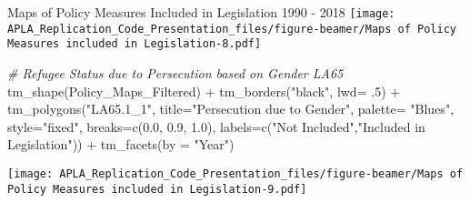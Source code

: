 \documentclass[
  ignorenonframetext,
]{beamer}
\newenvironment{Shaded}{\begin{snugshade}}{\end{snugshade}}
\newcommand{\AttributeTok}[1]{\textcolor[rgb]{0.77,0.63,0.00}{#1}}
\newcommand{\CommentTok}[1]{\textcolor[rgb]{0.56,0.35,0.01}{\textit{#1}}}
\newcommand{\DecValTok}[1]{\textcolor[rgb]{0.00,0.00,0.81}{#1}}
\newcommand{\FloatTok}[1]{\textcolor[rgb]{0.00,0.00,0.81}{#1}}
\newcommand{\FunctionTok}[1]{\textcolor[rgb]{0.00,0.00,0.00}{#1}}
\newcommand{\NormalTok}[1]{#1}
\newcommand{\SpecialCharTok}[1]{\textcolor[rgb]{0.00,0.00,0.00}{#1}}
\newcommand{\StringTok}[1]{\textcolor[rgb]{0.31,0.60,0.02}{#1}}
\begin{document}
\begin{frame}[fragile]{Maps of Policy Measures Included in Legislation
1990 - 2018}
\texttt{[image: APLA\_Replication\_Code\_Presentation\_files/figure-beamer/Maps of Policy Measures included in Legislation-8.pdf]}

\begin{Shaded}
\begin{Highlighting}[]
\CommentTok{\# Refugee Status due to Persecution based on Gender LA65 }
\FunctionTok{tm\_shape}\NormalTok{(Policy\_Maps\_Filtered) }\SpecialCharTok{+} \FunctionTok{tm\_borders}\NormalTok{(}\StringTok{"black"}\NormalTok{, }\AttributeTok{lwd=}\NormalTok{ .}\DecValTok{5}\NormalTok{) }\SpecialCharTok{+} \FunctionTok{tm\_polygons}\NormalTok{(}\StringTok{"LA65.1\_1"}\NormalTok{, }\AttributeTok{title=}\StringTok{"Persecution due to Gender"}\NormalTok{, }\AttributeTok{palette=} \StringTok{"Blues"}\NormalTok{, }\AttributeTok{style=}\StringTok{"fixed"}\NormalTok{, }\AttributeTok{breaks=}\FunctionTok{c}\NormalTok{(}\FloatTok{0.0}\NormalTok{, }\FloatTok{0.9}\NormalTok{, }\FloatTok{1.0}\NormalTok{), }\AttributeTok{labels=}\FunctionTok{c}\NormalTok{(}\StringTok{"Not Included"}\NormalTok{,}\StringTok{"Included in Legislation"}\NormalTok{)) }\SpecialCharTok{+} \FunctionTok{tm\_facets}\NormalTok{(}\AttributeTok{by =} \StringTok{"Year"}\NormalTok{)}
\end{Highlighting}
\end{Shaded}

\texttt{[image: APLA\_Replication\_Code\_Presentation\_files/figure-beamer/Maps of Policy Measures included in Legislation-9.pdf]}
\end{frame}
\end{document}

